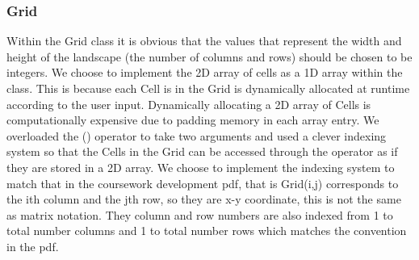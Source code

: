\subsubsection{Grid}
Within the Grid class it is obvious that the values that represent the width and height of the landscape (the number of columns and rows) should be chosen to be integers. We choose to implement the 2D array of cells as a 1D array within the class. This is because each Cell is in the Grid is dynamically allocated at runtime according to the user input. Dynamically allocating a 2D array of Cells is computationally expensive due to padding memory in each array entry. We overloaded the () operator to take two arguments and used a clever indexing system so that the Cells in the Grid can be accessed through the operator as if they are stored in a 2D array. We choose to implement the indexing system to match that in the coursework development pdf, that is Grid(i,j) corresponds to the ith column and the jth row, so they are x-y coordinate, this is not the same as matrix notation. They column and row numbers are also indexed from 1 to total number columns and 1 to total number rows which matches the convention in the pdf.


